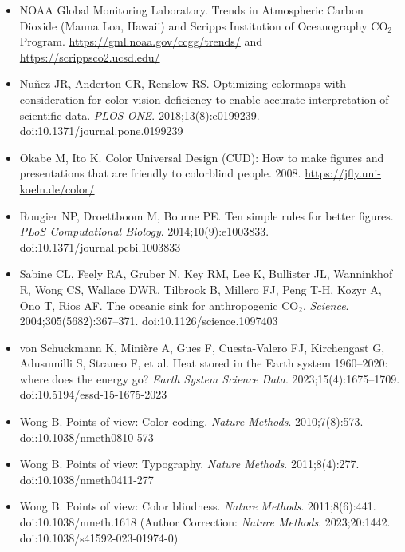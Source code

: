 {\begin{itemize}
\item NOAA Global Monitoring Laboratory. Trends in Atmospheric Carbon Dioxide (Mauna Loa, Hawaii) and Scripps Institution of Oceanography $\text{CO}_2$ Program. \url{https://gml.noaa.gov/ccgg/trends/} and \url{https://scrippsco2.ucsd.edu/}
\item Nuñez JR, Anderton CR, Renslow RS. Optimizing colormaps with consideration for color vision deficiency to enable accurate interpretation of scientific data. \textit{PLOS ONE}. 2018;13(8):e0199239. doi:10.1371/journal.pone.0199239
\item Okabe M, Ito K. Color Universal Design (CUD): How to make figures and presentations that are friendly to colorblind people. 2008. \url{https://jfly.uni-koeln.de/color/}
\item Rougier NP, Droettboom M, Bourne PE. Ten simple rules for better figures. \textit{PLoS Computational Biology}. 2014;10(9):e1003833. doi:10.1371/journal.pcbi.1003833
\item Sabine CL, Feely RA, Gruber N, Key RM, Lee K, Bullister JL, Wanninkhof R, Wong CS, Wallace DWR, Tilbrook B, Millero FJ, Peng T-H, Kozyr A, Ono T, Rios AF. The oceanic sink for anthropogenic $\text{CO}_2$. \textit{Science}. 2004;305(5682):367--371. doi:10.1126/science.1097403
\item von Schuckmann K, Minière A, Gues F, Cuesta-Valero FJ, Kirchengast G, Adusumilli S, Straneo F, et al. Heat stored in the Earth system 1960--2020: where does the energy go? \textit{Earth System Science Data}. 2023;15(4):1675--1709. doi:10.5194/essd-15-1675-2023
\item Wong B. Points of view: Color coding. \textit{Nature Methods}. 2010;7(8):573. doi:10.1038/nmeth0810-573
\item Wong B. Points of view: Typography. \textit{Nature Methods}. 2011;8(4):277. doi:10.1038/nmeth0411-277
\item Wong B. Points of view: Color blindness. \textit{Nature Methods}. 2011;8(6):441. doi:10.1038/nmeth.1618 (Author Correction: \textit{Nature Methods}. 2023;20:1442. doi:10.1038/s41592-023-01974-0)
\end{itemize}
\par}
